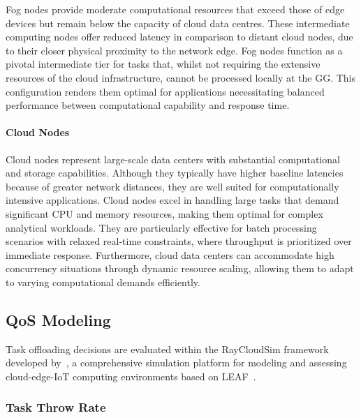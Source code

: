 \documentclass{svproc}
\begin{document}
Fog nodes provide moderate computational resources that exceed those of edge devices but remain below the capacity of cloud data centres. These intermediate computing nodes offer reduced latency in comparison to distant cloud nodes, due to their closer physical proximity to the network edge. Fog nodes function as a pivotal intermediate tier for tasks that, whilst not requiring the extensive resources of the cloud infrastructure, cannot be processed locally at the GG. This configuration renders them optimal for applications necessitating balanced performance between computational capability and response time.

\paragraph{Cloud Nodes}\label{subsubsec:Cloud}
Cloud nodes represent large-scale data centers with substantial computational and storage capabilities. Although they typically have higher baseline latencies because of greater network distances, they are well suited for computationally intensive applications. Cloud nodes excel in handling large tasks that demand significant CPU and memory resources, making them optimal for complex analytical workloads. They are particularly effective for batch processing scenarios with relaxed real-time constraints, where throughput is prioritized over immediate response. Furthermore, cloud data centers can accommodate high concurrency situations through dynamic resource scaling, allowing them to adapt to varying computational demands efficiently.


\subsection{QoS Modeling}\label{sec:qos_modeling}

Task offloading decisions are evaluated within the RayCloudSim framework developed by~\cite{zhang2022osttd}, a comprehensive simulation platform for modeling and assessing cloud-edge-IoT computing environments based on LEAF~\cite{WiesnerThamsen_LEAF_2021}.

\subsubsection{Task Throw Rate}\label{subsubsec:task_throw_rate}
\end{document}
